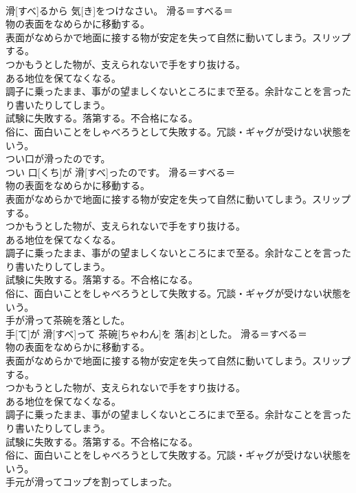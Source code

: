 \documentclass[8pt]{extreport}
\begin{document}
\begin{CJK}{UTF8}{min}
{\\	滑[すべ]るから 気[き]をつけなさい。	滑る＝すべる＝ 
\\	物の表面をなめらかに移動する。 
\\	表面がなめらかで地面に接する物が安定を失って自然に動いてしまう。スリップする。 
\\	つかもうとした物が、支えられないで手をすり抜ける。 
\\	ある地位を保てなくなる。 
\\	調子に乗ったまま、事がの望ましくないところにまで至る。余計なことを言ったり書いたりしてしまう。 
\\	試験に失敗する。落第する。不合格になる。 
\\	俗に、面白いことをしゃべろうとして失敗する。冗談・ギャグが受けない状態をいう。
\\	つい口が滑ったのです。	
\\	つい 口[くち]が 滑[すべ]ったのです。	滑る＝すべる＝ 
\\	物の表面をなめらかに移動する。 
\\	表面がなめらかで地面に接する物が安定を失って自然に動いてしまう。スリップする。 
\\	つかもうとした物が、支えられないで手をすり抜ける。 
\\	ある地位を保てなくなる。 
\\	調子に乗ったまま、事がの望ましくないところにまで至る。余計なことを言ったり書いたりしてしまう。 
\\	試験に失敗する。落第する。不合格になる。 
\\	俗に、面白いことをしゃべろうとして失敗する。冗談・ギャグが受けない状態をいう。
\\	手が滑って茶碗を落とした。	
\\	手[て]が 滑[すべ]って 茶碗[ちゃわん]を 落[お]とした。	滑る＝すべる＝ 
\\	物の表面をなめらかに移動する。 
\\	表面がなめらかで地面に接する物が安定を失って自然に動いてしまう。スリップする。 
\\	つかもうとした物が、支えられないで手をすり抜ける。 
\\	ある地位を保てなくなる。 
\\	調子に乗ったまま、事がの望ましくないところにまで至る。余計なことを言ったり書いたりしてしまう。 
\\	試験に失敗する。落第する。不合格になる。 
\\	俗に、面白いことをしゃべろうとして失敗する。冗談・ギャグが受けない状態をいう。
\\	手元が滑ってコップを割ってしまった。	
}
\end{CJK}
\end{document}
